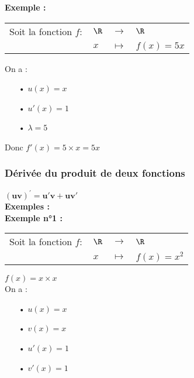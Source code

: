 \textbf{Exemple :} \\

\begin{tabular}{llll}
Soit la fonction $f :$ & $\R$ & $\longrightarrow$ & $\R$ \\
& $x$ & $\longmapsto$ & $f(x) = 5x$ \\
\end{tabular}

\vspace*{.3cm}

On a : \\

\begin{itemize}
\item[•] $u\left(x\right) = x$
\item[•] $u'\left(x\right) = 1$
\item[•] $\lambda = 5$
\end{itemize}

Donc $f'(x) = 5 \times x = 5x$ \\

\newpage

\subsubsection{Dérivée du produit de deux fonctions}

$\mathbf{\left(uv\right)^{'} = u'v + uv'}$ \\

\textbf{Exemples :} \\

\textbf{Exemple n°1 :} \\

\begin{tabular}{llll}
Soit la fonction $f :$ & $\R$ & $\longrightarrow$ & $\R$ \\
& $x$ & $\longmapsto$ & $f(x) = x^2$ \\
\end{tabular}

\vspace*{.3cm}

$f(x) = x \times x$ \\

On a : \\

\begin{itemize}
\item[•] $u\left(x\right) = x$
\item[•] $v\left(x\right) = x$
\item[•] $u'\left(x\right) = 1$
\item[•] $v'\left(x\right) = 1$
\end{itemize}

